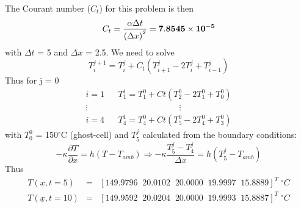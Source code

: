 \documentclass[calculator,steamtables,datasheet,solutions]{exam}
\newcommand{\frc}{\displaystyle\frac}
\begin{document}
\begin{question}
\begin{enumerate}
{The Courant number ($C_{t}$) for this problem is then~
\begin{displaymath}
   C_{t} = \frc{\alpha \Delta t}{\left(\Delta x\right)^{2}} = {\bf 7.8545\times 10^{-5}}
\end{displaymath}
with $\Delta t$ = 5 and $\Delta x$ = 2.5. We need to solve
\begin{displaymath}
    T_{i}^{j+1} = T_{i}^{j} + C_{t}\left(T_{i+1}^{j}-2T_{i}^{j}+T_{i-1}^{j}\right)
\end{displaymath}
Thus for j = 0~
\begin{eqnarray}
    i=1 && T_{1}^{1} = T_{1}^{0} + Ct\left(T_{2}^{0}-2T_{1}^{0}+T_{0}^{0}\right) \nonumber \\
     \vdots && \hspace{3cm} \vdots \nonumber \\
    i=4 && T_{4}^{1} = T_{4}^{0} + Ct\left(T_{5}^{0}-2T_{4}^{0}+T_{3}^{0}\right) \nonumber
\end{eqnarray}
with $T_{0}^{0}$ = 150$^{\circ}$C (ghost-cell) and $T_{5}^{j}$ calculated from the boundary conditions:~
\begin{displaymath}
-\kappa\frc{\partial T}{\partial x} = h\left(T-T_{amb}\right)\Longrightarrow -\kappa \frc{T^{j}_{5}-T^{j}_{4}}{\Delta x} = h\left(T_{5}^{j}-T_{amb}\right)
\end{displaymath}
Thus~
{\bf \begin{eqnarray}
   T\left(\underline{x},t=5\right)  &=& \left[ 149.9796\;\; 20.0102 \;\; 20.0000\;\; 19.9997\;\; 15.8889\right]^{T}\; ^{\circ}C \nonumber \\
   T\left(\underline{x},t=10\right) &=& \left[ 149.9592\;\; 20.0204 \;\; 20.0000\;\; 19.9993\;\; 15.8887\right]^{T}\; ^{\circ}C \nonumber \\
\end{eqnarray}}

}

\end{enumerate}

\end{question}
\end{document}
